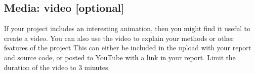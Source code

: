 \subsection*{Media: video  [optional]}
If your project includes an interesting animation, then you might find it useful to create a video.
You can also use the video to explain your methods or other features of the project
This can either be included in the upload with your report and source code, or posted to YouTube
with a link in your report. Limit the duration of the video to 3 minutes.


